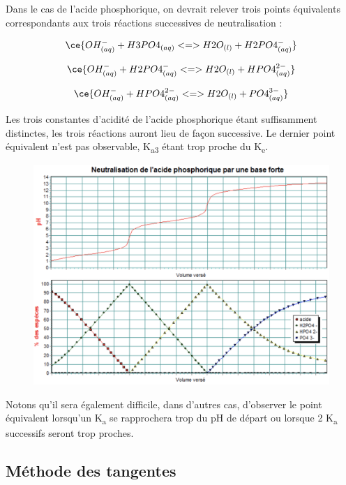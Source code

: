 \documentclass[
  11pt,
  a4paper,
  openany]{book}
\begin{document}
Dans le cas de l'acide phosphorique, on devrait relever trois points équivalents correspondants aux trois réactions successives de neutralisation :

\[
\ce{OH^{-}_{(aq)} + H3PO4_{(aq)} <=> H2O_{(l)} + H2PO4^{-}_{(aq)}}
\]

\[
\ce{OH^{-}_{(aq)} + H2PO4^{-}_{(aq)} <=> H2O_{(l)} + HPO4^{2-}_{(aq)}}
\]

\[
\ce{OH^{-}_{(aq)} + HPO4^{2-}_{(aq)} <=> H2O_{(l)} + PO4^{3-}_{(aq)}}
\]

Les trois constantes d'acidité de l'acide phosphorique étant suffisamment distinctes, les trois réactions auront lieu de façon successive. Le dernier point équivalent n'est pas observable, K\textsubscript{a3} étant trop proche du K\textsubscript{e}.

\begin{figure}

{\centering \includegraphics[width=1\linewidth]{images/acides-bases-6d} 

}

\end{figure}

Notons qu'il sera également difficile, dans d'autres cas, d'observer le point équivalent lorsqu'un K\textsubscript{a} se rapprochera trop du pH de départ ou lorsque 2 K\textsubscript{a} successifs seront trop proches.

\subsection{Méthode des tangentes}\label{muxe9thode-des-tangentes}
\end{document}
